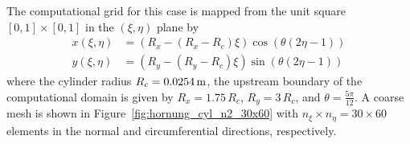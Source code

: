 The computational grid for this case is mapped from the unit square $\left[0,1\right]\times\left[0,1\right]$ in the $\left(\xi,\eta\right)$ plane by~\cite{shu_fd_fv_dg_icase}
\begin{align}
  x(\xi,\eta) &= \left(R_x - \left(R_x - R_c\right)\xi\right) \cos\left(\theta\left(2\eta - 1\right)\right) \\
  y(\xi,\eta) &= \left(R_y - \left(R_y - R_c\right)\xi\right) \sin\left(\theta\left(2\eta - 1\right)\right) 
\end{align}
where the cylinder radius $R_c=\unit[0.0254]{m}$, the upstream boundary of the computational domain is given by $R_x=1.75\,R_c$, $R_y=3\,R_c$, and $\theta=\frac{5\pi}{12}$.  A coarse mesh is shown in Figure~\ref{fig:hornung_cyl_n2_30x60} with $n_\xi\times n_\eta=30\times 60$ elements in the normal and circumferential directions, respectively.

